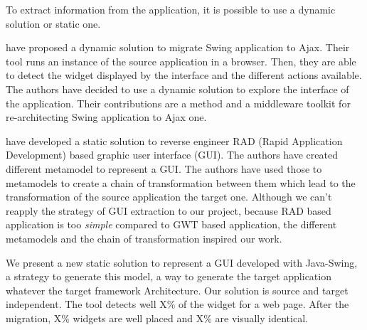 \documentclass[conference]{IEEEtran}
\begin{document}

To extract information from the application, it is possible to use a dynamic solution or static one. 

\cite{samir2007swing2script} have proposed a dynamic solution to migrate Swing application to Ajax.
Their tool runs an instance of the source application in a browser.
Then, they are able to detect the widget displayed by the interface and the different actions available.
The authors have decided to use a dynamic solution to explore the interface of the application.
Their contributions are a method and a middleware toolkit for re-architecting Swing application to Ajax one.

\cite{sanchez2014model} have developed a static solution to reverse engineer RAD (Rapid Application Development) based graphic user interface (GUI).
The authors have created different metamodel to represent a GUI.
The authors have used those to metamodels to create a chain of transformation between them which lead to the transformation of 
    the source  application the target one.
Although we can't reapply the strategy of GUI extraction to our project, because RAD based application is too \emph{simple} compared to GWT based application,
    the different metamodels and the chain of transformation inspired our work.


We present a new static solution to represent a GUI developed with Java-Swing, 
    a strategy to generate this model,
    a way to generate the target application whatever the target framework Architecture.
Our solution is source and target independent.
The tool detects well X\% of the widget for a web page.
After the migration, X\% widgets are well placed and X\% are visually identical.
\end{document}
